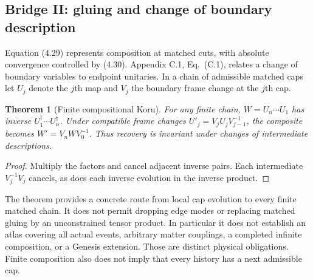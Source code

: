 \documentclass[11pt,a4paper]{article}
\newtheorem{theorem}{Theorem}[section]\newtheorem{proposition}[theorem]{Proposition}\newtheorem{definition}[theorem]{Definition}\newtheorem{example}[theorem]{Example}
\begin{document}
\subsection{Bridge II: gluing and change of boundary description}
Equation (4.29) represents composition at matched cuts, with absolute convergence controlled by (4.30). Appendix C.1, Eq.~(C.1), relates a change of boundary variables to endpoint unitaries. In a chain of admissible matched caps let $U_j$ denote the $j$th map and $V_j$ the boundary frame change at the $j$th cap.
\begin{theorem}[Finite compositional Koru]\label{thm:glue}
For any finite chain, $W=U_n\cdots U_1$ has inverse $U_1^\dagger\cdots U_n^\dagger$. Under compatible frame changes $U'_j=V_j U_j V_{j-1}^{-1}$, the composite becomes $W'=V_n W V_0^{-1}$. Thus recovery is invariant under changes of intermediate descriptions.
\end{theorem}
\begin{proof} Multiply the factors and cancel adjacent inverse pairs. Each intermediate $V_j^{-1}V_j$ cancels, as does each inverse evolution in the inverse product.\end{proof}
The theorem provides a concrete route from local cap evolution to every finite matched chain. It does not permit dropping edge modes or replacing matched gluing by an unconstrained tensor product. In particular it does not establish an atlas covering all actual events, arbitrary matter couplings, a completed infinite composition, or a Genesis extension. Those are distinct physical obligations. Finite composition also does not imply that every history has a next admissible cap.
\end{document}
